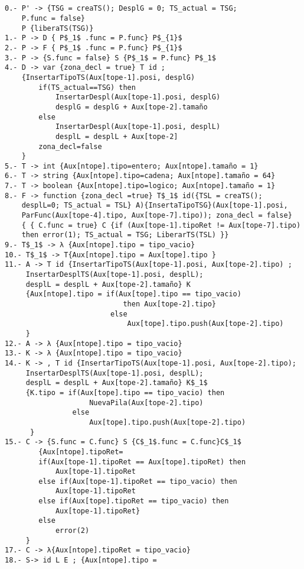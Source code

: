 \documentclass[a4paper, 12pt]{article}
\begin{document}
\begin{lstlisting}[style=EstadosAutomataST]


0.- P' -> {TSG = creaTS(); DesplG = 0; TS_actual = TSG;
    P.func = false}
    P {liberaTS(TSG)}
1.- P -> D { P$_1$ .func = P.func} P$_{1}$
2.- P -> F { P$_1$ .func = P.func} P$_{1}$
3.- P -> {S.func = false} S {P$_1$ = P.func} P$_1$
4.- D -> var {zona_decl = true} T id ;
    {InsertarTipoTS(Aux[tope-1].posi, desplG)
        if(TS_actual==TSG) then
            InsertarDespl(Aux[tope-1].posi, desplG)
            desplG = desplG + Aux[tope-2].tamaño
        else
            InsertarDespl(Aux[tope-1].posi, desplL)
            desplL = desplL + Aux[tope-2]
        zona_decl=false
    }
5.- T -> int {Aux[ntope].tipo=entero; Aux[ntope].tamaño = 1}
6.- T -> string {Aux[ntope].tipo=cadena; Aux[ntope].tamaño = 64}
7.- T -> boolean {Aux[ntope].tipo=logico; Aux[ntope].tamaño = 1}
8.- F -> function {zona_decl =true} T$_1$ id({TSL = creaTS();
    desplL=0; TS_actual = TSL} A){InsertaTipoTSG}(Aux[tope-1].posi,
    ParFunc(Aux[tope-4].tipo, Aux[tope-7].tipo)); zona_decl = false}
    { { C.func = true} C {if (Aux[tope-1].tipoRet != Aux[tope-7].tipo)
    then error(1); TS_actual = TSG; LiberarTS(TSL) }}
9.- T$_1$ -> λ {Aux[ntope].tipo = tipo_vacio}
10.- T$_1$ -> T{Aux[ntope].tipo = Aux[tope].tipo }
11.- A -> T id {InsertarTipoTS(Aux[tope-1].posi, Aux[tope-2].tipo) ;
     InsertarDesplTS(Aux[tope-1].posi, desplL);
     desplL = desplL + Aux[tope-2].tamaño} K
     {Aux[ntope].tipo = if(Aux[tope].tipo == tipo_vacio)
                            then Aux[tope-2].tipo}
                         else
                             Aux[tope].tipo.push(Aux[tope-2].tipo)
     }
12.- A -> λ {Aux[ntope].tipo = tipo_vacio}
13.- K -> λ {Aux[ntope].tipo = tipo_vacio}
14.- K -> , T id {InsertarTipoTS(Aux[tope-1].posi, Aux[tope-2].tipo);
     InsertarDesplTS(Aux[tope-1].posi, desplL);
     desplL = desplL + Aux[tope-2].tamaño} K$_1$
     {K.tipo = if(Aux[tope].tipo == tipo_vacio) then
                    NuevaPila(Aux[tope-2].tipo)
                else
                    Aux[tope].tipo.push(Aux[tope-2].tipo)
      }
15.- C -> {S.func = C.func} S {C$_1$.func = C.func}C$_1$
        {Aux[ntope].tipoRet=
        if(Aux[tope-1].tipoRet == Aux[tope].tipoRet) then
            Aux[tope-1].tipoRet
        else if(Aux[tope-1].tipoRet == tipo_vacio) then
            Aux[tope-1].tipoRet
        else if(Aux[tope].tipoRet == tipo_vacio) then
            Aux[tope-1].tipoRet}
        else
            error(2)
     }
17.- C -> λ{Aux[ntope].tipoRet = tipo_vacio}
18.- S-> id L E ; {Aux[ntope].tipo =

\end{lstlisting}
\end{document}
